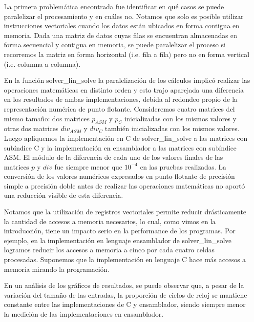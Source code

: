 
\par La primera problemática encontrada fue identificar en qué casos se puede paralelizar el procesamiento y en cuáles no. Notamos que solo es posible utilizar instrucciones vectoriales cuando los datos están ubicados en forma contigua en memoria. Dada una matriz de datos cuyas filas se encuentran almacenadas en forma secuencial y contigua en memoria, se puede paralelizar el proceso si recorremos la matriz en forma horizontal (i.e. fila a fila) pero no en forma vertical (i.e. columna a columna).\newline
\par En la función solver\_lin\_solve la paralelización de los cálculos implicó realizar las operaciones matemáticas en distinto orden y esto trajo aparejada una diferencia en los resultados de ambas implementaciones, debida al redondeo propio de la representación numérica de punto flotante. Consideremos cuatro matrices del mismo tamaño: dos matrices $p_{ASM}$ y $p_C$ inicializadas con los mismos valores y otras dos matrices $div_{ASM}$ y $div_C$ también inicializadas con los mismos valores. Luego apliquemos la implementación en C de solver\_lin\_solve a las matrices con subíndice C y la implementación en ensamblador a las matrices con subíndice ASM. El módulo de la diferencia de cada uno de los valores finales de las matrices $p$ y $div$ fue siempre menor que $10^{-4}$ en las pruebas realizadas. La conversión de los valores numéricos expresados en punto flotante de precisión simple a precisión doble antes de realizar las operaciones matemáticas no aportó una reducción visible de esta diferencia.\newline
\par Notamos que la utilización de registros vectoriales permite reducir drásticamente la cantidad de accesos a memoria necesarios, lo cual, como vimos en la introducción, tiene un impacto serio en la performance de los programas. Por ejemplo, en la implementación en lenguaje ensamblador de solver\_lin\_solve logramos reducir los accesos a memoria a cinco por cada cuatro celdas procesadas. Suponemos que la implementación en lenguaje C hace más accesos a memoria mirando la programación.\newline
\par En un análisis de los gráficos de resultados, se puede observar que, a pesar de la variación del tamaño de las entradas, la proporción de ciclos de reloj se mantiene constante entre las implementaciones de C y ensamblador, siendo siempre menor la medición de las implementaciones en ensamblador.\newline
